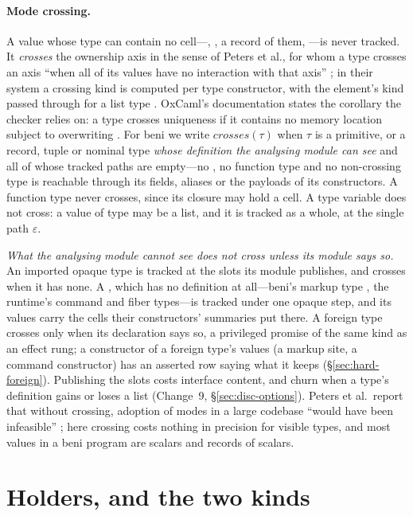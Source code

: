 \paragraph{Mode crossing.} A value whose type can contain no cell---, , a record
of them, ---is never tracked. It \emph{crosses} the ownership axis in the sense of Peters
et al., for whom a type crosses an axis ``when all of its values have no interaction with that axis''
\citep[\S2.3]{peters2026mode}; in their system a crossing kind is computed per type constructor, with
the element's kind passed through for a list type \citep[\S4.1]{peters2026mode}. OxCaml's
documentation states the corollary the checker relies on: a type crosses uniqueness if it contains no
memory location subject to overwriting \citep{oxcaml2025uniqueness}. For beni we write
$\mathit{crosses}(\tau)$ when $\tau$ is a primitive, or a record, tuple or nominal type \emph{whose
definition the analysing module can see} and all of whose tracked paths are empty---no , no
function type and no non-crossing type is reachable through its fields, aliases or the payloads of its
constructors. A function type never crosses, since its closure may hold a cell. A type variable does
not cross: a value of type  may be a list, and it is tracked as a whole, at the single path
$\varepsilon$.

\emph{What the analysing module cannot see does not cross unless its module says so.} An imported
opaque type is tracked at the slots its module publishes, and crosses when it has none. A
, which has no definition at all---beni's markup type , the runtime's
command and fiber types---is tracked under one opaque step, and its values carry the cells their
constructors' summaries put there. A foreign type crosses only when its declaration says so, a privileged
promise of the same kind as an effect rung; a constructor of a foreign type's values (a markup site, a
command constructor) has an asserted row saying what it keeps (\S\ref{sec:hard-foreign}). Publishing the
slots costs interface content, and churn when a type's definition gains or loses a list
(Change~9, \S\ref{sec:disc-options}). Peters et al.\ report that without crossing, adoption of modes in a large
codebase ``would have been infeasible'' \citep[\S1]{peters2026mode}; here crossing costs nothing in
precision for visible types, and most values in a beni program are scalars and records of scalars.

\section{Holders, and the two kinds}
\label{sec:model-holders}


